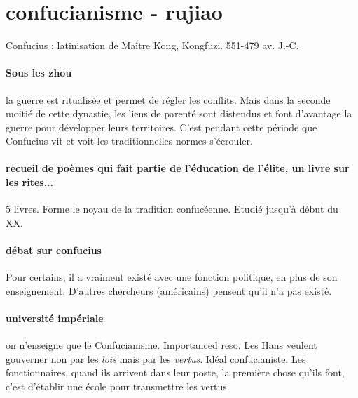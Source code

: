 \section{confucianisme - rujiao    }
Confucius : latinisation de Maître Kong, Kongfuzi.  551-479 av. J.-C.


\paragraph{Sous les zhou} la guerre est ritualisée et permet de régler les conflits. 
Mais dans la seconde moitié de cette dynastie, les liens de parenté sont distendus et font d'avantage la guerre pour développer leurs territoires. C'est pendant cette période que Confucius vit et voit les traditionnelles normes s'écrouler.




\paragraph{recueil de poèmes qui fait partie de l'éducation de l'élite, un livre sur les rites...} 5 livres. Forme le noyau de la tradition confucéenne. Etudié jusqu'à début du XX.

\paragraph{débat sur confucius} Pour certains, il a vraiment existé avec une fonction politique, en plus de son enseignement. D'autres chercheurs (américains) pensent qu'il n'a pas existé.

\paragraph{université impériale} on n'enseigne que le Confucianisme. Importanced reso. Les Hans veulent gouverner non par les \textit{lois } mais par les \textit{vertus}. Idéal confucianiste. Les fonctionnaires, quand ils arrivent dans leur poste, la première chose qu'ils font, c'est d'établir une école pour transmettre les vertus.

